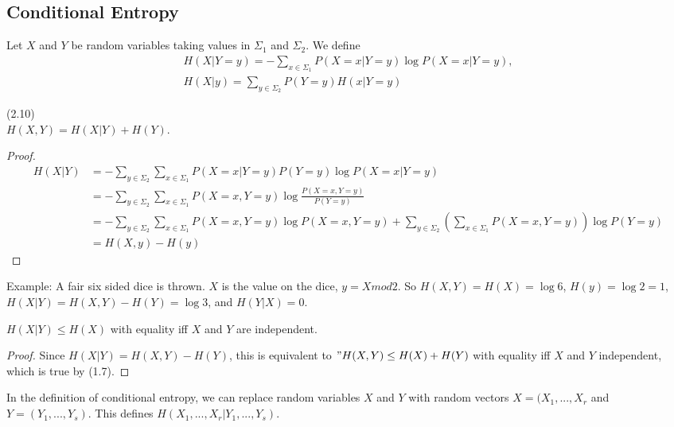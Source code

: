 \documentclass[a4paper]{article}
\begin{document}
\subsection{Conditional Entropy}

Let $X$ and $Y$ be random variables taking values in $\Sigma_1$ and $\Sigma_2$. We define
\begin{equation*}
\begin{aligned}
H(X | Y=y) = -\sum_{x \in \Sigma_1} P(X=x|Y=y) \log P(X=x|Y=y),\\
H(X|y) = \sum_{y \in \Sigma_2} P(Y=y)H(x|Y=y)
\end{aligned}
\end{equation*}

\begin{lemma} (2.10)\\
$H(X,Y) = H(X|Y) + H(Y)$.
\begin{proof}
\begin{equation*}
\begin{aligned}
H(X|Y) &= -\sum_{y \in \Sigma_2} \sum_{x \in \Sigma_1} P(X=x|Y=y) P(Y=y) \log P(X=x|Y=y)\\
&= -\sum_{y \in \Sigma_2} \sum_{x \in \Sigma_1} P(X=x,Y=y) \log \frac{P(X=x,Y=y)}{P(Y=y)}\\
&= -\sum_{y \in \Sigma_2} \sum_{x \in \Sigma_1} P(X=x,Y=y) \log P(X=x,Y=y) + \sum_{y \in \Sigma_2} (\sum_{x \in \Sigma_1} P(X=x,Y=y) ) \log P(Y=y)\\
&= H(X,y) - H(y)
\end{aligned}
\end{equation*}
\end{proof}
\end{lemma}

Example: A fair six sided dice is thrown. $X$ is the value on the dice, $y=X mod 2$. So $H(X,Y) = H(X) =\log 6$, $H(y) = \log 2 = 1$, $H(X|Y) = H(X,Y)-H(Y)= \log 3$, and $H(Y|X) = 0$.


\begin{coro}
$H(X|Y) \leq H(X)$ with equality iff $X$ and $Y$ are independent.
\begin{proof}
Since $H(X|Y) = H(X,Y) - H(Y)$, this is equivalent to $"H(X,Y) \leq H(X)+H(Y)$ with equality iff $X$ and $Y$ independent, which is true by (1.7).
\end{proof}
\end{coro}

In the definition of conditional entropy, we can replace random variables $X$ and $Y$ with random vectors $X=(X_1,...,X_r$ and $Y=(Y_1,...,Y_s)$. This defines $H(X_1,...,X_r| Y_1,...,Y_s)$.
\end{document}
